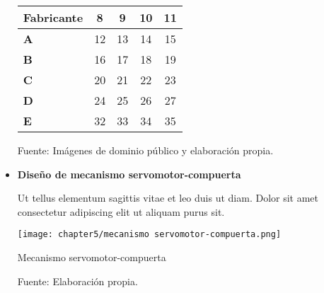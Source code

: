 \begin{itemize}
\begin{mytable}[H]
\begin{tabular}{l|c|c|c|c|}
			\multicolumn{1}{|l|}{\textbf{Fabricante}} & 8                                                                     & 9          & 10         & 11         \\ \hline
			\multicolumn{1}{|l|}{\textbf{A}}          & 12                                                                    & 13         & 14         & 15         \\ \hline
			\multicolumn{1}{|l|}{\textbf{B}}          & 16                                                                    & 17         & 18         & 19         \\ \hline
			\multicolumn{1}{|l|}{\textbf{C}}          & 20                                                                    & 21         & 22         & 23         \\ \hline
			\multicolumn{1}{|l|}{\textbf{D}}          & 24                                                                    & 25         & 26         & 27         \\ \hline
			\multicolumn{1}{|l|}{\textbf{E}}          & 32                                                                    & 33         & 34         & 35         \\ \hline
		\end{tabular}
		\begin{flushleft}	
			Fuente: Imágenes de dominio público y elaboración propia.
		\end{flushleft}
	\end{mytable}
	
	
%		
%		
%		
%		


	\item \textbf{Diseño de mecanismo servomotor-compuerta} 
	
	Ut tellus elementum sagittis vitae et leo duis ut diam. Dolor sit amet consectetur adipiscing elit ut aliquam purus sit. 
	
	\begin{myfigure}[H]
		\centering
		\texttt{[image: chapter5/mecanismo servomotor-compuerta.png]}
		\caption{Mecanismo servomotor-compuerta}
		\begin{myflushleftportland}
			Fuente: Elaboración propia.
		\end{myflushleftportland}
		\label{fig:mecanismo servomotor-compuerta}
	\end{myfigure}
	

\end{itemize}
